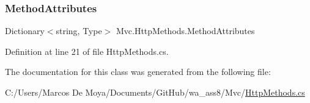 \subsubsection{\texorpdfstring{Method\+Attributes}{MethodAttributes}}
{\footnotesize\ttfamily Dictionary$<$string, Type$>$ Mvc.\+Http\+Methods.\+Method\+Attributes\hspace{0.3cm}{\ttfamily [get]}}



Definition at line 21 of file Http\+Methods.\+cs.



The documentation for this class was generated from the following file\+:\begin{DoxyCompactItemize}
\item 
C\+:/\+Users/\+Marcos De Moya/\+Documents/\+Git\+Hub/wa\+\_\+ass8/\+Mvc/\hyperlink{_http_methods_8cs}{Http\+Methods.\+cs}\end{DoxyCompactItemize}
